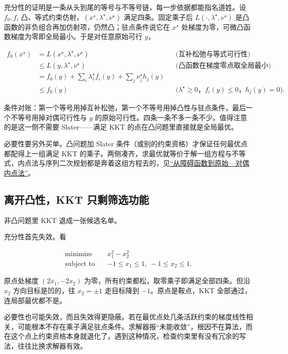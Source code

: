 充分性的证明是一条从头到尾的等号与不等号链，每一步依据都能指名道姓。设 \(f_0,f_i\) 凸、等式约束仿射，\((x^\star,\lambda^\star,\nu^\star)\) 满足四条。固定乘子后 \(L(\cdot,\lambda^\star,\nu^\star)\) 是凸函数的非负组合再加仿射项，仍然凸；驻点条件说它在 \(x^\star\) 处梯度为零，可微凸函数梯度为零即全局最小。于是对任意原始可行 \(y\)，

\[
\begin{aligned}
f_0(x^\star)
&=L(x^\star,\lambda^\star,\nu^\star)&&\text{(互补松弛与等式可行性)}\\
&\le L(y,\lambda^\star,\nu^\star)&&\text{(凸函数在梯度零点取全局最小)}\\
&=f_0(y)+\sum_i\lambda_i^\star f_i(y)+\sum_j\nu_j^\star h_j(y)\\
&\le f_0(y)&&\text{(\(\lambda^\star\ge0\)，\(f_i(y)\le0\)，\(h_j(y)=0\))}.
\end{aligned}
\]

条件对账：第一个等号用掉互补松弛，第一个不等号用掉凸性与驻点条件，最后一个不等号用掉对偶可行性与 \(y\) 的原始可行性。四条一条不多一条不少。值得注意的是这一侧不需要 Slater——满足 KKT 的点在凸问题里直接就是全局最优。

必要性要另外买单。凸问题加 Slater 条件（或别的约束资格）才保证任何最优点都配得上一组满足 KKT 的乘子。两侧凑齐，求最优就等价于解一组方程与不等式，内点法与序列二次规划都是奔着这组方程去的，见\hyperref[sec:09-Convex-Optimization/06-Optimization-Algorithms/05]{``从障碍函数到原始---对偶内点法''}。

\subsection{离开凸性，KKT 只剩筛选功能}

非凸问题里 KKT 退成一张候选名单。

充分性首先失效。看

\[
\begin{aligned}
\text{minimize}\quad&x_1^2-x_2^2\\
\text{subject to}\quad&-1\le x_1\le1,\ -1\le x_2\le1.
\end{aligned}
\]

原点处梯度 \((2x_1,-2x_2)\) 为零，所有约束都松，取零乘子即满足全部四条。但沿 \(x_2\) 方向目标是凹的，往 \(x_2=\pm1\) 走目标降到 \(-1\)。原点是鞍点，KKT 全部通过，连局部最优都不是。

必要性也可能失效，而且失效得更隐蔽。若在最优点处几条活跃约束的梯度线性相关，可能根本不存在乘子满足驻点条件。求解器报``未能收敛''，根因不在算法，而在这个点上约束资格本身就退化了。遇到这种情况，检查约束里有没有冗余的写法，往往比换求解器有效。

